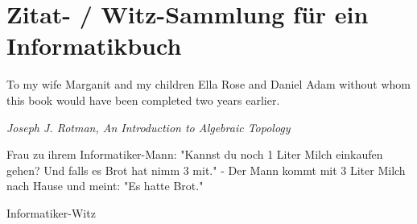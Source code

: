 
\section{Zitat- / Witz-Sammlung für ein Informatikbuch}

\epigraph{To my wife Marganit and my children Ella Rose and Daniel Adam without whom this book would have been completed two years earlier.}
{\textit{Joseph J. Rotman, An Introduction to Algebraic Topology}}

\epigraph{Frau zu ihrem Informatiker-Mann: "Kannst du noch 1 Liter Milch einkaufen gehen? Und falls es Brot hat nimm 3 mit." - Der Mann kommt mit 3 Liter Milch nach Hause und meint: "Es hatte Brot."}{Informatiker-Witz}
